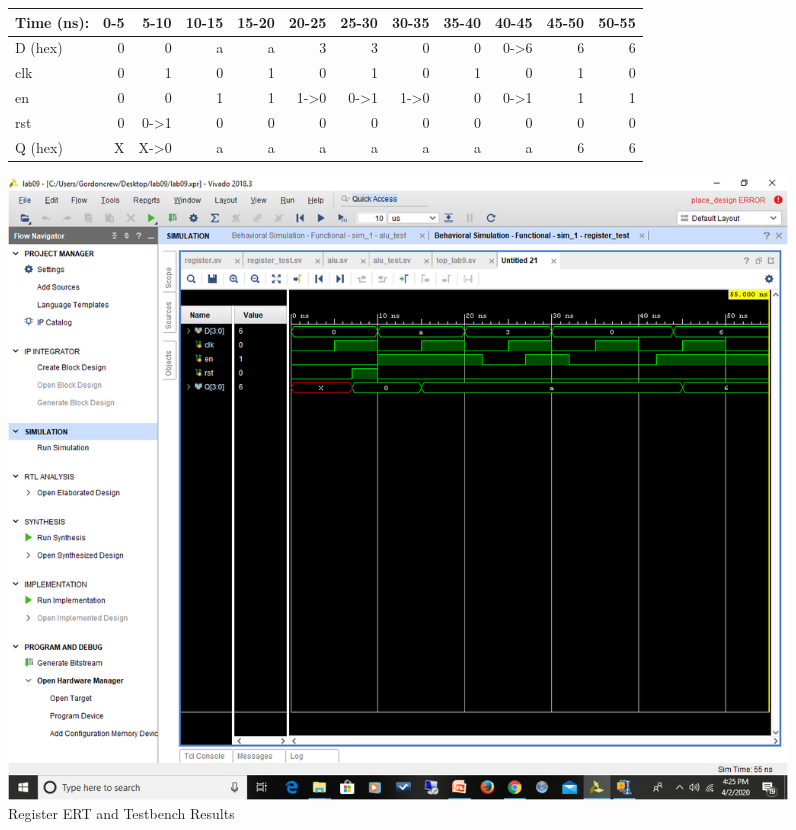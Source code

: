 \documentclass[11pt]{article}
\begin{document}
\begin{figure}[ht]\centering
	\begin{tabular}{l|rrrrrrrrrrr}
		Time (ns): & 0-5 & 5-10 & 10-15 & 15-20 & 20-25 & 25-30 & 30-35 & 35-40 & 40-45 & 45-50 & 50-55 \\
		\midrule 
		D (hex) & 0 & 0 & a & a & 3 & 3 & 0 & 0 & 0->6 & 6 & 6  \\
		clk & 0 & 1 & 0 & 1 & 0 & 1 & 0 & 1 & 0 & 1 & 0 \\
		en & 0 & 0 & 1 & 1 & 1->0 & 0->1 & 1->0 & 0 & 0->1 & 1 & 1 \\
		rst & 0 & 0->1 & 0 & 0 & 0 & 0 & 0 & 0 & 0 & 0 & 0 \\
		\midrule
		Q (hex) & X & X->0 & a & a & a & a & a & a & a & 6 & 6  \\
		\bottomrule
	\end{tabular}\medskip

	\includegraphics[width=1.15\textwidth, trim=5.6cm 12cm 0cm 3.5cm,clip]{register.png}
	\caption{Register ERT and Testbench Results}
	\label{fig:sim_with_table}
\end{figure}
\end{document}
